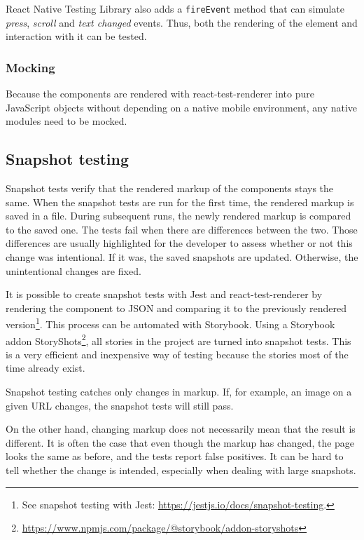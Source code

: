 \documentclass[
  digital, %
  table,   %
  oneside, %
  lof,     %
  lot,     %
]{fithesis3}
\begin{document}
React Native Testing Library also adds a \texttt{fireEvent} method that can simulate \textit{press}, \textit{scroll} and \textit{text changed} events. Thus, both the rendering of the element and interaction with it can be tested.

\subsubsection{Mocking}
Because the components are rendered with react-test-renderer into pure JavaScript objects without depending on a native mobile environment, any native modules need to be mocked.

\subsection{Snapshot testing}
\label{sec:snapshot_testing}
Snapshot tests verify that the rendered markup of the components stays the same. When the snapshot tests are run for the first time, the rendered markup is saved in a file.
During subsequent runs, the newly rendered markup is compared to the saved one. The tests fail when there are differences between the two. Those differences are usually highlighted for the developer to assess whether or not this change was intentional. If it was, the saved snapshots are updated. Otherwise, the unintentional changes are fixed.

It is possible to create snapshot tests with Jest and react-test-renderer by rendering the component to JSON and comparing it to the previously rendered version\footnote{See snapshot testing with Jest: \url{https://jestjs.io/docs/snapshot-testing}.}. This process can be automated with Storybook. Using a Storybook addon StoryShots\footnote{\url{https://www.npmjs.com/package/@storybook/addon-storyshots}}, all stories in the project are turned into snapshot tests. This is a very efficient and inexpensive way of testing because the stories most of the time already exist.

Snapshot testing catches only changes in markup. If, for example, an image on a given URL changes, the snapshot tests will still pass. 

On the other hand, changing markup does not necessarily mean that the result is different. It is often the case that even though the markup has changed, the page looks the same as before, and the tests report false positives. It can be hard to tell whether the change is intended, especially when dealing with large snapshots.
\end{document}
